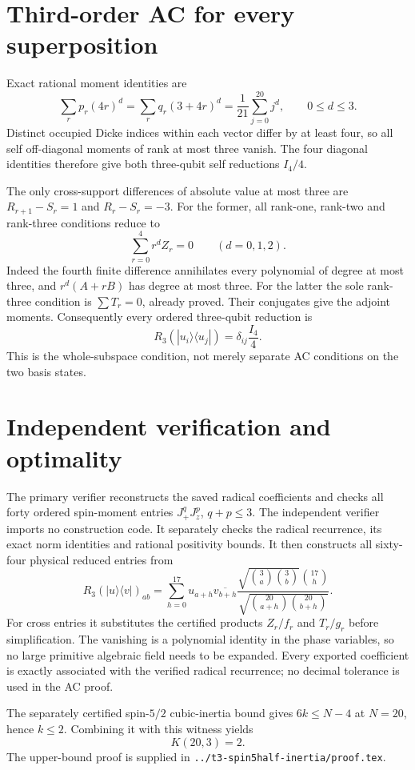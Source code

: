 \documentclass[11pt]{article}
\begin{document}
\section{Third-order AC for every superposition}
Exact rational moment identities are
\[
 \sum_r p_r(4r)^d=\sum_r q_r(3+4r)^d
 =\frac1{21}\sum_{j=0}^{20}j^d,\qquad0\leq d\leq3.
\]
Distinct occupied Dicke indices within each vector differ by at least four,
so all self off-diagonal moments of rank at most three vanish. The four
diagonal identities therefore give both three-qubit self reductions $I_4/4$.

The only cross-support differences of absolute value at most three are
$R_{r+1}-S_r=1$ and $R_r-S_r=-3$. For the former, all rank-one, rank-two and
rank-three conditions reduce to
\[
 \sum_{r=0}^{4}r^dZ_r=0\qquad(d=0,1,2).
\]
Indeed the fourth finite difference annihilates every polynomial of degree
at most three, and $r^d(A+rB)$ has degree at most three. For the latter the
sole rank-three condition is $\sum T_r=0$, already proved. Their conjugates
give the adjoint moments. Consequently every ordered three-qubit reduction is
\[
 R_3(|u_i\rangle\langle u_j|)=\delta_{ij}\frac{I_4}{4}.
\]
This is the whole-subspace condition, not merely separate AC conditions on
the two basis states.

\section{Independent verification and optimality}
The primary verifier reconstructs the saved radical coefficients and checks
all forty ordered spin-moment entries $J_+^qJ_z^p$, $q+p\leq3$.
The independent verifier imports no construction code. It separately checks
the radical recurrence, its exact norm identities and rational positivity
bounds. It then constructs all sixty-four physical reduced entries from
\[
 R_3(|u\rangle\langle v|)_{ab}
 =\sum_{h=0}^{17}u_{a+h}\overline{v_{b+h}}
 \frac{\sqrt{\binom3a\binom3b}\binom{17}h}
 {\sqrt{\binom{20}{a+h}\binom{20}{b+h}}}.
\]
For cross entries it substitutes the certified products $Z_r/f_r$ and
$T_r/g_r$ before simplification. The vanishing is a polynomial identity in
the phase variables, so no large primitive algebraic field needs to be
expanded. Every exported coefficient is exactly associated with the
verified radical recurrence; no decimal tolerance is used in the AC proof.

The separately certified spin-$5/2$ cubic-inertia bound gives
$6k\leq N-4$ at $N=20$, hence $k\leq2$. Combining it with this witness yields
\[
 \boxed{K(20,3)=2.}
\]
The upper-bound proof is supplied in
\texttt{../t3-spin5half-inertia/proof.tex}.
\end{document}

